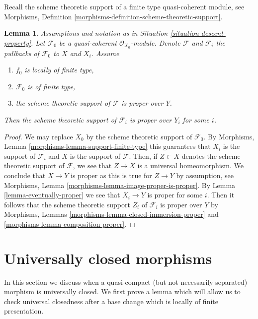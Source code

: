\documentclass{stacks-project}
\theoremstyle{plain}
\newtheorem{lemma}[subsection]{Lemma}
\theoremstyle{definition}
\theoremstyle{remark}
\numberwithin{equation}{subsection}
\begin{document}
\noindent
Recall the scheme theoretic support of
a finite type quasi-coherent module, see
Morphisms, Definition \ref{morphisms-definition-scheme-theoretic-support}.

\begin{lemma}
\label{lemma-eventually-proper-support}
Assumptions and notation as in Situation \ref{situation-descent-property}.
Let $\mathcal{F}_0$ be a quasi-coherent $\mathcal{O}_{X_0}$-module.
Denote $\mathcal{F}$ and $\mathcal{F}_i$ the pullbacks of
$\mathcal{F}_0$ to $X$ and $X_i$. Assume
\begin{enumerate}
\item $f_0$ is locally of finite type,
\item $\mathcal{F}_0$ is of finite type,
\item the scheme theoretic support of $\mathcal{F}$ is proper over $Y$.
\end{enumerate}
Then the scheme theoretic support of $\mathcal{F}_i$ is proper over $Y_i$
for some $i$.
\end{lemma}

\begin{proof}
We may replace $X_0$ by the scheme theoretic support of $\mathcal{F}_0$.
By Morphisms, Lemma \ref{morphisms-lemma-support-finite-type} this
guarantees that $X_i$ is the support of $\mathcal{F}_i$ and $X$ is the
support of $\mathcal{F}$. Then, if $Z \subset X$ denotes the scheme
theoretic support of $\mathcal{F}$, we see that $Z \to X$ is a universal
homeomorphism. We conclude that $X \to Y$ is proper as this is true for
$Z \to Y$ by assumption, see
Morphisms, Lemma \ref{morphisms-lemma-image-proper-is-proper}.
By Lemma \ref{lemma-eventually-proper} we see that $X_i \to Y$ is proper
for some $i$. Then it follows that the scheme theoretic support $Z_i$ of
$\mathcal{F}_i$ is proper over $Y$ by
Morphisms, Lemmas \ref{morphisms-lemma-closed-immersion-proper} and
\ref{morphisms-lemma-composition-proper}.
\end{proof}











\section{Universally closed morphisms}
\label{section-universally-closed}

\noindent
In this section we discuss when a quasi-compact (but not necessarily
separated) morphism is universally closed. We first prove a lemma which
will allow us to check universal closedness after a base change
which is locally of finite presentation.
\end{document}
